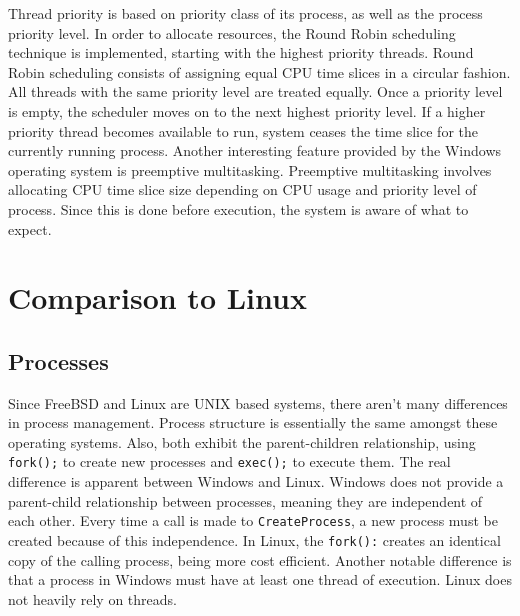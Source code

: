 \documentclass[10pt, onecolumn]{IEEEtran}
\begin{document}
        Thread priority is based on priority class of its process, as well as the process priority level. In order to allocate resources, the Round Robin scheduling technique is implemented, starting with the highest priority threads. Round Robin scheduling consists of assigning equal CPU time slices in a circular fashion. All threads with the same priority level are treated equally. Once a priority level is empty, the scheduler moves on to the next highest priority level. If a higher priority thread becomes available to run, system ceases the time slice for the currently running process. Another interesting feature provided by the Windows operating system is preemptive multitasking. Preemptive multitasking involves allocating CPU time slice size depending on CPU usage and priority level of process. Since this is done before execution, the system is aware of what to expect.
        
    \vspace{4mm}
    
    
    \section*{Comparison to Linux}
    
    \subsection*{Processes}
        Since FreeBSD and Linux are UNIX based systems, there aren't many differences in process management. Process structure is essentially the same amongst these operating systems. Also, both exhibit the parent-children relationship, using \texttt{fork();} to create new processes and \texttt{exec();} to execute them. The real difference is apparent between Windows and Linux. 
        Windows does not provide a parent-child relationship between processes, meaning they are independent of each other. Every time a call is made to \texttt{CreateProcess}, a new process must be created because of this independence. In Linux, the \texttt{fork():} creates an identical copy of the calling process, being more cost efficient. Another notable difference is that a process in Windows must have at least one thread of execution. Linux does not heavily rely on threads.
        
    \vspace{3mm}
    
\end{document}
